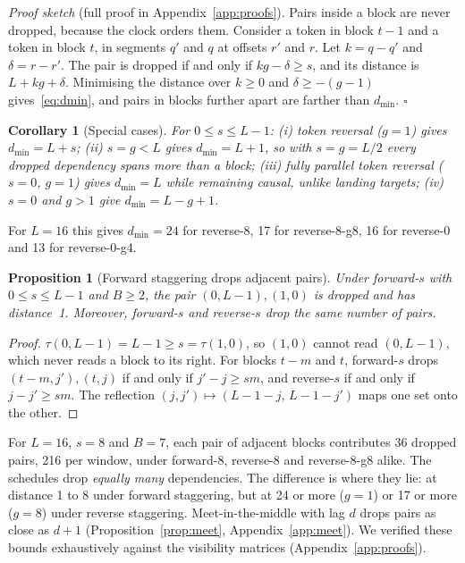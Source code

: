 \documentclass[11pt]{article}
\newtheorem{proposition}{Proposition}
\newtheorem{corollary}{Corollary}
\theoremstyle{definition}
\theoremstyle{remark}
\newcommand{\sch}[1]{\textsf{#1}}
\newcommand{\dmin}{d_{\min}}
\begin{document}
\noindent\emph{Proof sketch} (full proof in Appendix~\ref{app:proofs}).
Pairs inside a block are never dropped, because the clock orders them.
Consider a token in block $t-1$ and a token in block $t$, in segments $q'$ and $q$ at offsets $r'$ and $r$.
Let $k=q-q'$ and $\delta=r-r'$.
The pair is dropped if and only if $kg-\delta\ge s$, and its distance is $L+kg+\delta$.
Minimising the distance over $k\ge0$ and $\delta\ge-(g-1)$ gives~\eqref{eq:dmin}, and pairs in blocks further apart are farther than $\dmin$.
\hfill$\square$

\begin{corollary}[Special cases]
\label{cor:cases}
For $0\le s\le L-1$:
(i) token reversal ($g=1$) gives $\dmin=L+s$;
(ii) $s=g<L$ gives $\dmin=L+1$, so with $s=g=L/2$ every dropped dependency spans more than a block;
(iii) fully parallel token reversal ($s=0$, $g=1$) gives $\dmin=L$ while remaining causal, unlike landing targets;
(iv) $s=0$ and $g>1$ give $\dmin=L-g+1$.
\end{corollary}

For $L=16$ this gives $\dmin=24$ for \sch{reverse-8}, 17 for \sch{reverse-8-g8}, 16 for \sch{reverse-0} and 13 for \sch{reverse-0-g4}.

\begin{proposition}[Forward staggering drops adjacent pairs]
\label{prop:forward}
Under \sch{forward-$s$} with $0\le s\le L-1$ and $B\ge2$, the pair $(0,L-1),(1,0)$ is dropped and has distance~1.
Moreover, \sch{forward-$s$} and \sch{reverse-$s$} drop the same number of pairs.
\end{proposition}

\begin{proof}
$\tau(0,L-1)=L-1\ge s=\tau(1,0)$, so $(1,0)$ cannot read $(0,L-1)$, which never reads a block to its right.
For blocks $t-m$ and $t$, \sch{forward-$s$} drops $(t-m,j'),(t,j)$ if and only if $j'-j\ge sm$, and \sch{reverse-$s$} if and only if $j-j'\ge sm$.
The reflection $(j,j')\mapsto(L-1-j,\,L-1-j')$ maps one set onto the other.
\end{proof}

For $L=16$, $s=8$ and $B=7$, each pair of adjacent blocks contributes 36 dropped pairs, 216 per window, under \sch{forward-8}, \sch{reverse-8} and \sch{reverse-8-g8} alike.
The schedules drop \emph{equally many} dependencies.
The difference is where they lie: at distance 1 to 8 under forward staggering, but at 24 or more ($g=1$) or 17 or more ($g=8$) under reverse staggering.
Meet-in-the-middle with lag $d$ drops pairs as close as $d+1$ (Proposition~\ref{prop:meet}, Appendix~\ref{app:meet}).
We verified these bounds exhaustively against the visibility matrices (Appendix~\ref{app:proofs}).
\end{document}
